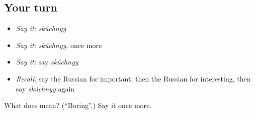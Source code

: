 \subsection*{Your turn}
\begin{itemize}
\raggedright
  \item \emph{Say it:} \emph{skúchnyy}
  \item \emph{Say it:} \emph{skúchnyy}, once more
  \item \emph{Say it:} say \emph{skúchnyy}
  \item \emph{Recall:} say the Russian for important, then the Russian for interesting, then say \emph{skúchnyy} again
\end{itemize}

\begin{tcolorbox}[breakable,colback=teal!4,colframe=teal!35!black,title={Before you move on}]
What does  mean? (\textquotedblleft{}Boring\textquotedblright{}.) Say it once more.
\end{tcolorbox}
